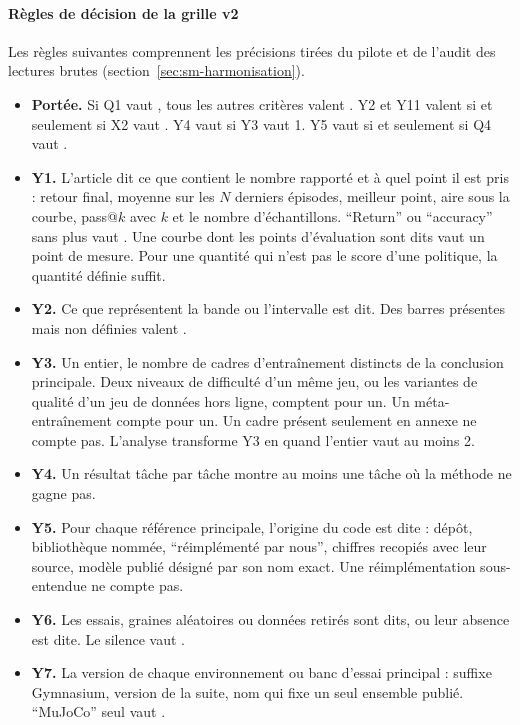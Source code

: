 \paragraph{Règles de décision de la grille v2}
Les règles suivantes comprennent les précisions tirées du pilote et de l'audit des lectures brutes
(section~\ref{sec:sm-harmonisation}).
\begin{itemize}
  \item \textbf{Portée.} Si Q1 vaut , tous les autres critères valent . Y2 et Y11
  valent  si et seulement si X2 vaut . Y4 vaut  si Y3 vaut 1. Y5 vaut
   si et seulement si Q4 vaut .
  \item \textbf{Y1.} L'article dit ce que contient le nombre rapporté et à quel point il est pris :
  retour final, moyenne sur les $N$ derniers épisodes, meilleur point, aire sous la courbe, pass@$k$
  avec $k$ et le nombre d'échantillons. \enquote{Return} ou \enquote{accuracy} sans plus vaut
  . Une courbe dont les points d'évaluation sont dits vaut un point de mesure. Pour une
  quantité qui n'est pas le score d'une politique, la quantité définie suffit.
  \item \textbf{Y2.} Ce que représentent la bande ou l'intervalle est dit. Des barres présentes mais non
  définies valent .
  \item \textbf{Y3.} Un entier, le nombre de cadres d'entraînement distincts de la conclusion
  principale. Deux niveaux de difficulté d'un même jeu, ou les variantes de qualité d'un jeu de données
  hors ligne, comptent pour un. Un méta-entraînement compte pour un. Un cadre présent seulement en
  annexe ne compte pas. L'analyse transforme Y3 en  quand l'entier vaut au moins 2.
  \item \textbf{Y4.} Un résultat tâche par tâche montre au moins une tâche où la méthode ne gagne pas.
  \item \textbf{Y5.} Pour chaque référence principale, l'origine du code est dite : dépôt, bibliothèque
  nommée, \enquote{réimplémenté par nous}, chiffres recopiés avec leur source, modèle publié désigné par
  son nom exact. Une réimplémentation sous-entendue ne compte pas.
  \item \textbf{Y6.} Les essais, graines aléatoires ou données retirés sont dits, ou leur absence est
  dite. Le silence vaut .
  \item \textbf{Y7.} La version de chaque environnement ou banc d'essai principal : suffixe Gymnasium,
  version de la suite, nom qui fixe un seul ensemble publié. \enquote{MuJoCo} seul vaut .

\end{itemize}
